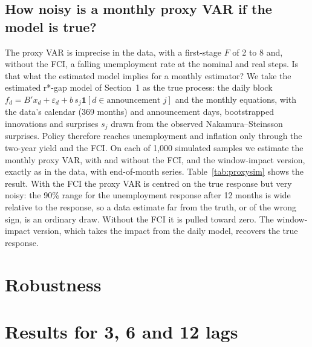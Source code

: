 \documentclass[11pt]{article}
\begin{document}
\subsection{How noisy is a monthly proxy VAR if the model is true?}
The proxy VAR is imprecise in the data, with a first-stage $F$ of 2 to 8 and, without the FCI, a falling unemployment rate at the nominal and real steps. Is that what the estimated model implies for a monthly estimator? We take the estimated r*-gap model of Section~1 as the true process: the daily block $f_d=B'x_d+\varepsilon_d+b\,s_j\mathbf 1[d\in\text{announcement } j]$ and the monthly equations, with the data's calendar (369 months) and announcement days, bootstrapped innovations and surprises $s_j$ drawn from the observed Nakamura--Steinsson surprises. Policy therefore reaches unemployment and inflation only through the two-year yield and the FCI. On each of 1,000 simulated samples we estimate the monthly proxy VAR, with and without the FCI, and the window-impact version, exactly as in the data, with end-of-month series. Table~\ref{tab:proxysim} shows the result. With the FCI the proxy VAR is centred on the true response but very noisy: the 90\% range for the unemployment response after 12 months is wide relative to the response, so a data estimate far from the truth, or of the wrong sign, is an ordinary draw. Without the FCI it is pulled toward zero. The window-impact version, which takes the impact from the daily model, recovers the true response.


\section{Robustness}




\appendix
\section{Results for 3, 6 and 12 lags}


\end{document}
